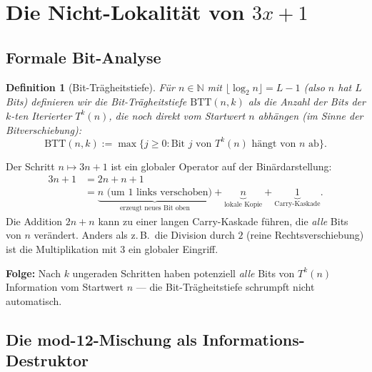 \documentclass[12pt,a4paper]{article}
\newtheorem{definition}{Definition}[section]
\newcommand{\N}{\mathbb{N}}
\begin{document}
\section{Die Nicht-Lokalität von $3x+1$}
\label{sec:nichtlokal}

\subsection{Formale Bit-Analyse}

\begin{definition}[Bit-Trägheitstiefe]
Für $n \in \N$ mit $\lfloor\log_2 n\rfloor = L-1$ (also $n$ hat $L$ Bits)
definieren wir die \emph{Bit-Trägheitstiefe} $\mathrm{BTT}(n, k)$ als die
Anzahl der Bits der $k$-ten Iterierter $T^k(n)$, die noch direkt vom
Startwert $n$ abhängen (im Sinne der Bitverschiebung):
\[
  \mathrm{BTT}(n, k) := \max\bigl\{j \geq 0 : \text{Bit } j \text{ von } T^k(n)
  \text{ hängt von } n \text{ ab}\bigr\}.
\]
\end{definition}

\begin{tcolorbox}[dynfeld, title={Nicht-Lokalität: Bit-Injektion durch $3x+1$}]
Der Schritt $n \mapsto 3n+1$ ist ein globaler Operator auf der Binärdarstellung:
\begin{align*}
  3n + 1 &= 2n + n + 1 \\
         &= \underbrace{n\text{ (um 1 links verschoben)}}_{\text{erzeugt neues Bit oben}}
           + \underbrace{n}_{\text{lokale Kopie}}
           + \underbrace{1}_{\text{Carry-Kaskade}}.
\end{align*}
Die Addition $2n + n$ kann zu einer langen Carry-Kaskade führen, die
\emph{alle} Bits von $n$ verändert. Anders als z.\,B.\ die Division durch $2$
(reine Rechtsverschiebung) ist die Multiplikation mit $3$ ein globaler Eingriff.

\medskip
\textbf{Folge:} Nach $k$ ungeraden Schritten haben potenziell \emph{alle}
Bits von $T^k(n)$ Information vom Startwert $n$ --- die Bit-Trägheitstiefe
schrumpft nicht automatisch.
\end{tcolorbox}

\subsection{Die mod-12-Mischung als Informations-Destruktor}
\end{document}

